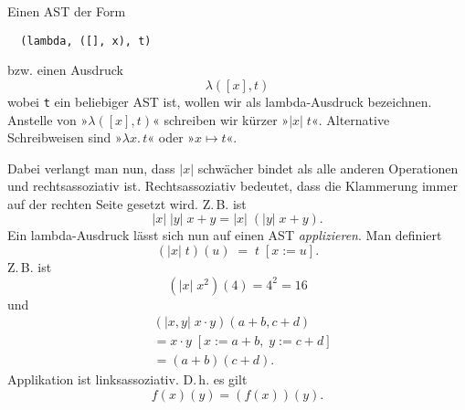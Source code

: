 \documentclass[a4paper,11pt,fleqn,twocolumn,twoside]{article}
\numberwithin{equation}{section}
\begin{document}
Einen AST der Form
\begin{verbatim}
  (lambda, ([], x), t)
\end{verbatim}
bzw. einen Ausdruck
\begin{equation}
\lambda([x],t)
\end{equation}
wobei \texttt{t} ein beliebiger AST ist,
wollen wir als lambda-Ausdruck bezeichnen. Anstelle von
»$\lambda([x],t)$« schreiben wir kürzer »$|x|\;t$«. Alternative
Schreibweisen sind »$\lambda x.\,t$« oder »$x\mapsto t$«.

Dabei verlangt man nun, dass $|x|$ schwächer bindet als alle anderen
Operationen und rechtsassoziativ ist. Rechtsassoziativ bedeutet, dass
die Klammerung immer auf der rechten Seite gesetzt wird. Z.\,B. ist
\begin{equation}
|x|\;|y|\; x+y = |x|\;(|y|\;x+y).
\end{equation}
Ein lambda-Ausdruck lässt sich nun auf einen AST \emph{applizieren}.
Man definiert
\begin{equation}
(|x|\; t)(u) \;=\; t\;[x:=u].
\end{equation}
Z.\,B. ist
\begin{equation}
(|x|\;x^2)(4) = 4^2 = 16
\end{equation}
und
\begin{equation}
\begin{split}
& (|x,y|\;x\cdot y)(a+b,c+d)\\
&= x\cdot y\;[x:=a+b,\;y:=c+d]\\
&= (a+b)(c+d).
\end{split}
\end{equation}
Applikation ist linksassoziativ. D.\,h. es gilt
\begin{equation}
f(x)(y) = (f(x))(y).
\end{equation}
\end{document}
